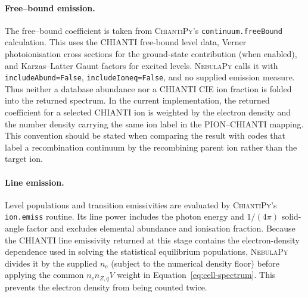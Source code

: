 \paragraph{Free--bound emission.}
The free--bound coefficient is taken from
\textsc{ChiantiPy}'s \texttt{continuum.freeBound} calculation.  This uses the
CHIANTI free-bound level data, Verner photoionisation cross sections for the
ground-state contribution (when enabled), and Karzas--Latter Gaunt factors for
excited levels.  \textsc{NebulaPy} calls it with
\texttt{includeAbund=False}, \texttt{includeIoneq=False}, and no supplied
emission measure.  Thus neither a database abundance nor a CHIANTI CIE ion
fraction is folded into the returned spectrum.  In the current implementation,
the returned coefficient for a selected CHIANTI ion is weighted by the electron
density and the number density carrying the same ion label in the PION--CHIANTI
mapping.  This convention should be stated when comparing the result with codes
that label a recombination continuum by the recombining parent ion rather than
the target ion.

\paragraph{Line emission.}
Level populations and transition emissivities are evaluated by
\textsc{ChiantiPy}'s \texttt{ion.emiss} routine.  Its line power includes the
photon energy and $1/(4\pi)$ solid-angle factor and excludes elemental abundance
and ionisation fraction.  Because the CHIANTI line emissivity returned at this
stage contains the electron-density dependence used in solving the statistical
equilibrium populations, \textsc{NebulaPy} divides it by the supplied
$n_{\mathrm e}$ (subject to the numerical density floor) before applying the
common $n_{\mathrm e}n_{Z,q}V$ weight in
Equation~\eqref{eq:cell-spectrum}.  This prevents the electron density from
being counted twice.

